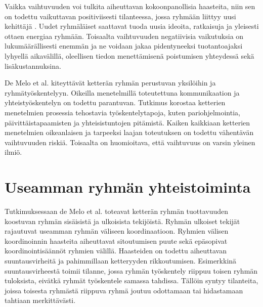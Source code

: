 Vaikka vaihtuvuuden voi tulkita aiheuttavan kokoonpanollisia haasteita, niin sen on todettu vaikuttavan positiviisesti tilanteessa, jossa ryhmään liittyy uusi kehittäjä \cite{DEOMELO2013412}. Uudet ryhmäläiset saattavat tuoda uusia ideoita, ratkaisuja ja yleisesti ottaen energiaa ryhmään. Toisaalta vaihtuvuuden negatiivisia vaikutuksia on lukumäärällisesti enemmän ja ne voidaan jakaa pidentyneeksi tuotantoajaksi lyhyellä aikavälillä, oleellisen tiedon menettämisenä poistumisen yhteydessä sekä lisäkustannuksina. 

De Melo et al. \cite{DEOMELO2013412} kiteyttävät ketterän ryhmän perustuvan yksilöihin ja ryhmätyöskentelyyn. Oikeilla menetelmillä toteutettuna kommunikaation ja yhteistyöskentelyn on todettu parantuvan. Tutkimus korostaa ketterien menetelmien prosessia tehostavia työskentelytapoja, kuten pariohjelmointia, päivittäistapaamisten ja yhteisistuntojen pitämistä. Kaiken kaikkiaan ketterien menetelmien oikeanlaisen ja tarpeeksi laajan toteutuksen on todettu vähentävän vaihtuvuuden riskiä. Toisaalta on huomioitava, että vaihtuvuus on varsin yleinen ilmiö.

\section{Useamman ryhmän yhteistoiminta}

Tutkimuksessaan de Melo et al. \cite{DEOMELO2013412} toteavat ketterän ryhmän tuottavuuden koostuvan ryhmän sisäisistä ja ulkoisista tekijöistä. Ryhmän ulkoiset tekijät rajautuvat useamman ryhmän väliseen koordinaatioon. Ryhmien välisen koordinoinnin haasteita aiheuttavat sitoutumisen puute sekä epäsopivat koordinointisäännöt ryhmien välillä. Haasteiden on todettu aiheuttavan suuntausvirheitä ja pahimmillaan ketteryyden rikkoutumisen. Esimerkkinä suuntausvirheestä toimii tilanne, jossa ryhmän työskentely riippuu toisen ryhmän tuloksista, eivätkä ryhmät työskentele samassa tahdissa. Tällöin syntyy tilanteita, joissa toisesta ryhmästä riippuva ryhmä joutuu odottamaan tai hidastamaan tahtiaan merkittävästi.